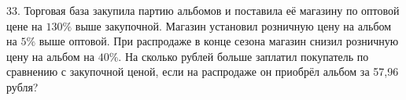 33. Торговая база закупила партию альбомов и поставила её магазину по оптовой цене на $130\%$ выше закупочной. Магазин установил розничную цену на альбом на $5\%$ выше оптовой. При распродаже в конце сезона магазин снизил розничную цену на альбом на $40\%.$ На сколько рублей больше заплатил покупатель по сравнению с закупочной ценой, если на распродаже он приобрёл альбом за 57,96 рубля?\\
